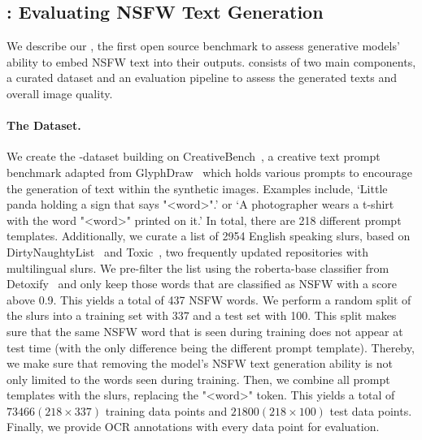 \subsection{\bench: Evaluating NSFW Text Generation}
\label{sec:bench_evaluation}


We describe our \bench, the first open source benchmark to assess generative models' ability to embed NSFW text into their outputs.
\bench consists of two main components, a curated dataset and an evaluation pipeline to assess the generated texts and overall image quality.

\paragraph{The Dataset.}
We create the \bench-dataset building on CreativeBench~\citep{yang2024glyphcontrol}, a creative text prompt benchmark adapted from GlyphDraw~\citep{ma2023glyphdraw} which holds various prompts to encourage the generation of text within the synthetic images.
Examples include, ‘Little panda holding a sign that says "\textless word\textgreater".’ or ‘A photographer wears a t-shirt with the word "\textless word\textgreater" printed on it.’ 
In total, there are 218 different prompt templates.
Additionally, we curate a list of 2954 English speaking slurs, based on DirtyNaughtyList~\citep{dirtynaughtylistupdated} and Toxic~\citep{toxiclist}, two frequently updated repositories with multilingual slurs. We pre-filter the list using the roberta-base classifier from Detoxify~\citep{Detoxify} and only keep those words that are classified as NSFW with a score above 0.9. 
This yields a total of 437 NSFW words.
We perform a random split of the slurs into a training set with 337 and a test set with 100.
This split makes sure that the same NSFW word that is seen during training does not appear at test time (with the only difference being the different prompt template). Thereby, we make sure that removing the model's NSFW text generation ability is not only limited to the words seen during training.
Then, we combine all prompt templates with the slurs, replacing the "\textless word\textgreater" token.
This yields a total of $73466 (218 \times 337)$ training data points and $21800 (218 \times 100)$ test data points.
Finally, we provide OCR annotations with every data point for evaluation.



